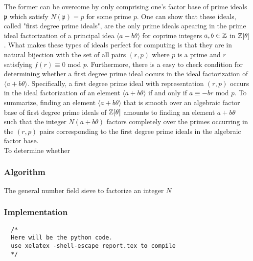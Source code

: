     The former can be overcome by only comprising one's factor base of prime ideals $\mathfrak{p}$ which satisfy $N(\mathfrak{p})=p$ for some prime $p$. One can show that these ideals, called "first degree prime ideals", are the only prime ideals apearing in the prime ideal factorization of a principal idea $\langle a + b \theta \rangle $ for coprime integers $a,b\in \mathbb{Z}$ in $\mathbb{Z}[\theta]$. What makes these types of ideals perfect for computing is that they are in natural bijection with the set of all pairs $(r,p)$ where $p$ is a prime and $r$ satisfying $f(r) \equiv 0$ mod $p$. Furthermore, there is a easy to check condition for determining whether a first degree prime ideal occurs in the ideal factorization of $\langle a + b \theta \rangle $. Specifically, a first degree prime ideal with representation $(r,p)$ occurs in the ideal factorization of an element $\langle a + b \theta \rangle $ if and only if $a \equiv -br $ mod $p$. To summarize, finding an element $\langle a + b \theta \rangle $ that is smooth over an algebraic factor base of first degree prime ideals of $\mathbb{Z}[\theta]$ amounts to finding an element $a + b \theta $ such that the integer $N(a + b \theta)$ factors completely over the primes occurring in the $(r,p)$ pairs corresponding to the first degree prime ideals in the algebraic factor base. \\

    To determine whether 


\subsubsection{Algorithm} \label{algo}

 
\begin{algorithm} 
  \caption{The general number field sieve to factorize an integer $N$}
  \begin{algorithmic}[1]
    \State {}
  \end{algorithmic} 
\end{algorithm} 


\subsubsection{Implementation}


\begin{verbatim}
  /*
  Here will be the python code.
  use xelatex -shell-escape report.tex to compile 
  */

\end{verbatim}



